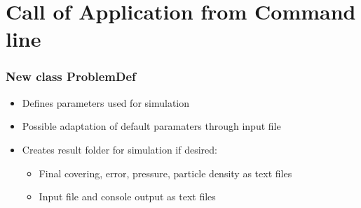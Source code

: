 \section{Call of Application from Command line}

\subsubsection{New class ProblemDef}
\begin{itemize}[noitemsep,topsep=0pt, partopsep=0pt]
\item Defines parameters used for simulation
\item Possible adaptation of default paramaters through input file
\item Creates result folder for simulation if desired:
	\begin{itemize}[noitemsep,topsep=0pt, partopsep=0pt]
	\item Final covering, error, pressure, particle density as text files
	\item Input file and console output as text files
	\end{itemize}
\end{itemize}

